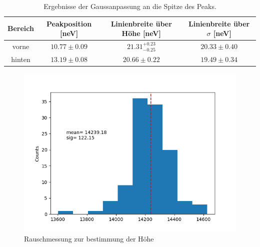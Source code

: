 \documentclass[12pt,a4paper]{article}
\begin{document}
\begin{table}
\centering
\begin{tabular}{|c|c|c|c|}
\hline 
Bereich & Peakposition [neV] & Linienbreite über Höhe [neV] & Linienbreite über $\sigma$ [neV]\\ 
\hline 
vorne & $10.77\pm 0.09$ & $21.31^{+0.23}_{-0.25}$ & $20.33\pm 0.40$ \\ 
\hline 
hinten & $13.19\pm 0.08$ & $20.66 \pm 0.22$ & $19.49\pm 0.34$ \\ 
\hline 
\end{tabular}
\caption{Ergebnisse der Gaussanpassung an die Spitze des Peaks.}
\label{tab:Ein_halbgauss}
\end{table}

\begin{figure}
\centering
\includegraphics[scale=0.49]{Bilder/Einlinien/Ein_Rausch.png}
\caption{Rauschmessung zur bestimmung der Höhe}
\label{fig:Ein_Rausch}
\end{figure}
\end{document}
